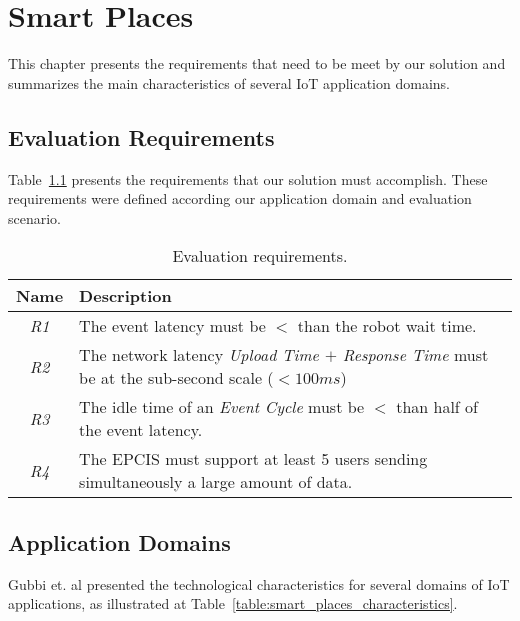 
\chapter{Smart Places}
\label{appendix:smart_place}
This chapter presents the requirements that need to be meet by our solution and summarizes the main
characteristics of several \gls{IoT} application domains.

\section{Evaluation Requirements}
\label{sec:eval_requirements}
Table~\ref{table:eval_requirements} presents the requirements that our solution must accomplish.
These requirements were defined according our application domain and evaluation scenario.

\begin{table}[ht!]
  \begin{tabular}{|c|l|}
    \hline
    Name          & Description                                                                                            \\ \hline
    \textit{R1}   & The event latency must be $<$ than the robot wait time.                                               \\ \hline
    \textit{R2}   & The network latency \textit{Upload Time $+$ Response Time} must be at the sub-second scale ($< 100ms$) \\ \hline
    \textit{R3}   & The idle time of an \textit{Event Cycle} must be $<$ than half of the event latency.                  \\ \hline
    \textit{R4}   & The EPCIS must support at least 5 users sending simultaneously a large amount of data.                 \\ \hline
  \end{tabular}
  \caption{Evaluation requirements.}
  \label{table:eval_requirements}
\end{table}

\section{Application Domains}
\label{sec:application_domains}

Gubbi et. al \cite{gubbi2013internet} presented the technological characteristics for several domains
of \gls{IoT} applications, as illustrated at Table~\ref{table:smart_places_characteristics}.

